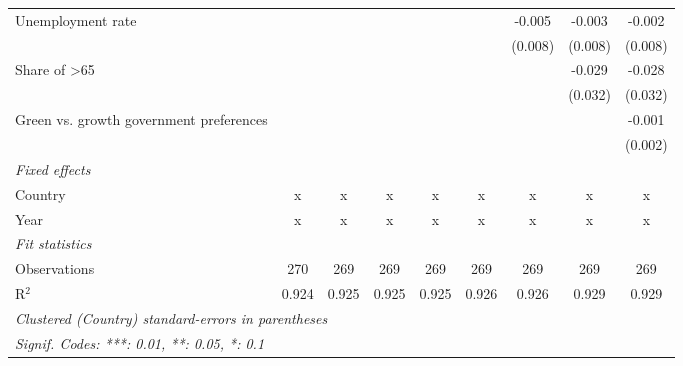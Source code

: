 \begin{table}[htbp]
\begin{tabular}{lcccccccc}
      Unemployment rate                                              &         &         &         &         &         & -0.005  & -0.003  & -0.002\\   
                                                                     &         &         &         &         &         & (0.008) & (0.008) & (0.008)\\   
      Share of >65                                                   &         &         &         &         &         &         & -0.029  & -0.028\\   
                                                                     &         &         &         &         &         &         & (0.032) & (0.032)\\   
      Green vs. growth government preferences                        &         &         &         &         &         &         &         & -0.001\\   
                                                                     &         &         &         &         &         &         &         & (0.002)\\   
      \emph{Fixed effects}\\
      Country                                                        & x       & x       & x       & x       & x       & x       & x       & x\\  
      Year                                                           & x       & x       & x       & x       & x       & x       & x       & x\\  
      \midrule \emph{Fit statistics}\\
      Observations                                                   & 270     & 269     & 269     & 269     & 269     & 269     & 269     & 269\\  
      R$^2$                                                          & 0.924   & 0.925   & 0.925   & 0.925   & 0.926   & 0.926   & 0.929   & 0.929\\  
      \midrule
      \multicolumn{9}{l}{\emph{Clustered (Country) standard-errors in parentheses}}\\
      \multicolumn{9}{l}{\emph{Signif. Codes: ***: 0.01, **: 0.05, *: 0.1}}\\
   \end{tabular}
\end{table}


